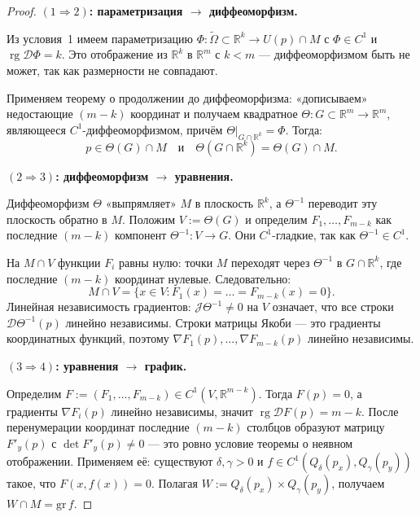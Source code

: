 \begin{proof}
  \textbf{$(1 \Rightarrow 2)$: параметризация $\to$ диффеоморфизм.}

  Из условия~1 имеем параметризацию $\Phi: \widetilde{\Omega} \subset \mathbb{R}^k
  \to U(p) \cap M$ с $\Phi \in C^1$ и $\operatorname{rg}\mathcal{D}\Phi = k$.
  Это отображение из $\mathbb{R}^k$ в $\mathbb{R}^m$ с $k < m$ ---
  диффеоморфизмом быть не может, так как размерности не совпадают.

  Применяем теорему о продолжении до диффеоморфизма: «дописываем»
  недостающие $(m-k)$ координат и получаем квадратное
  $\Theta: G \subset \mathbb{R}^m \to \mathbb{R}^m$, являющееся
  $C^1$-диффеоморфизмом, причём $\Theta\big|_{G \cap \mathbb{R}^k} = \Phi$.
  Тогда:
  \[
    p \in \Theta(G) \cap M
    \quad\text{и}\quad
    \Theta(G \cap \mathbb{R}^k) = \Theta(G) \cap M.
  \]

  \medskip
  \textbf{$(2 \Rightarrow 3)$: диффеоморфизм $\to$ уравнения.}

  Диффеоморфизм $\Theta$ «выпрямляет» $M$ в плоскость $\mathbb{R}^k$,
  а $\Theta^{-1}$ переводит эту плоскость обратно в $M$.
  Положим $V := \Theta(G)$ и определим $F_1, \ldots, F_{m-k}$
  как последние $(m-k)$ компонент $\Theta^{-1}: V \to G$.
  Они $C^1$-гладкие, так как $\Theta^{-1} \in C^1$.

  На $M \cap V$ функции $F_i$ равны нулю: точки $M$ переходят через
  $\Theta^{-1}$ в $G \cap \mathbb{R}^k$, где последние $(m-k)$ координат
  нулевые. Следовательно:
  \[
    M \cap V = \{x \in V : F_1(x) = \ldots = F_{m-k}(x) = 0\}.
  \]
  Линейная независимость градиентов: $\mathcal{J}\Theta^{-1} \neq 0$
  на $V$ означает, что все строки $\mathcal{D}\Theta^{-1}(p)$ линейно
  независимы. Строки матрицы Якоби --- это градиенты координатных
  функций, поэтому $\nabla F_1(p), \ldots, \nabla F_{m-k}(p)$
  линейно независимы.

  \medskip
  \textbf{$(3 \Rightarrow 4)$: уравнения $\to$ график.}

  Определим $F := (F_1, \ldots, F_{m-k}) \in C^1(V, \mathbb{R}^{m-k})$.
  Тогда $F(p) = 0$, а градиенты $\nabla F_i(p)$ линейно независимы,
  значит $\operatorname{rg}\mathcal{D}F(p) = m-k$.
  После перенумерации координат последние $(m-k)$ столбцов образуют
  матрицу $F'_y(p)$ с $\det F'_y(p) \neq 0$ --- это ровно условие
  теоремы о неявном отображении. Применяем её: существуют $\delta,
  \gamma > 0$ и $f \in C^1(Q_\delta(p_x), Q_\gamma(p_y))$ такое,
  что $F(x, f(x)) = 0$. Полагая $W := Q_\delta(p_x) \times Q_\gamma(p_y)$,
  получаем $W \cap M = \mathrm{gr}\,f$.


\end{proof}
